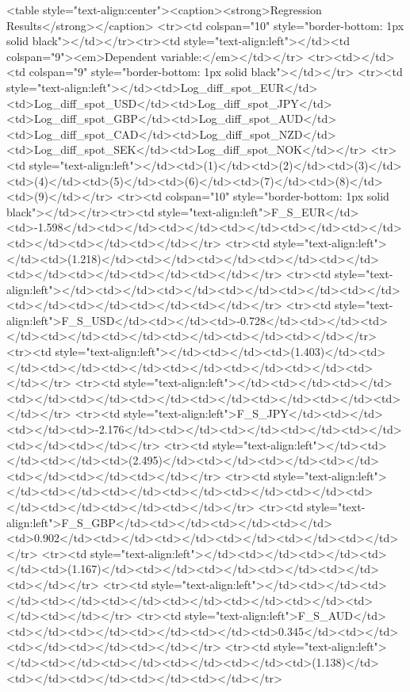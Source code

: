 
<table style="text-align:center"><caption><strong>Regression Results</strong></caption>
<tr><td colspan="10" style="border-bottom: 1px solid black"></td></tr><tr><td style="text-align:left"></td><td colspan="9"><em>Dependent variable:</em></td></tr>
<tr><td></td><td colspan="9" style="border-bottom: 1px solid black"></td></tr>
<tr><td style="text-align:left"></td><td>Log_diff_spot_EUR</td><td>Log_diff_spot_USD</td><td>Log_diff_spot_JPY</td><td>Log_diff_spot_GBP</td><td>Log_diff_spot_AUD</td><td>Log_diff_spot_CAD</td><td>Log_diff_spot_NZD</td><td>Log_diff_spot_SEK</td><td>Log_diff_spot_NOK</td></tr>
<tr><td style="text-align:left"></td><td>(1)</td><td>(2)</td><td>(3)</td><td>(4)</td><td>(5)</td><td>(6)</td><td>(7)</td><td>(8)</td><td>(9)</td></tr>
<tr><td colspan="10" style="border-bottom: 1px solid black"></td></tr><tr><td style="text-align:left">F_S_EUR</td><td>-1.598</td><td></td><td></td><td></td><td></td><td></td><td></td><td></td><td></td></tr>
<tr><td style="text-align:left"></td><td>(1.218)</td><td></td><td></td><td></td><td></td><td></td><td></td><td></td><td></td></tr>
<tr><td style="text-align:left"></td><td></td><td></td><td></td><td></td><td></td><td></td><td></td><td></td><td></td></tr>
<tr><td style="text-align:left">F_S_USD</td><td></td><td>-0.728</td><td></td><td></td><td></td><td></td><td></td><td></td><td></td></tr>
<tr><td style="text-align:left"></td><td></td><td>(1.403)</td><td></td><td></td><td></td><td></td><td></td><td></td><td></td></tr>
<tr><td style="text-align:left"></td><td></td><td></td><td></td><td></td><td></td><td></td><td></td><td></td><td></td></tr>
<tr><td style="text-align:left">F_S_JPY</td><td></td><td></td><td>-2.176</td><td></td><td></td><td></td><td></td><td></td><td></td></tr>
<tr><td style="text-align:left"></td><td></td><td></td><td>(2.495)</td><td></td><td></td><td></td><td></td><td></td><td></td></tr>
<tr><td style="text-align:left"></td><td></td><td></td><td></td><td></td><td></td><td></td><td></td><td></td><td></td></tr>
<tr><td style="text-align:left">F_S_GBP</td><td></td><td></td><td></td><td>0.902</td><td></td><td></td><td></td><td></td><td></td></tr>
<tr><td style="text-align:left"></td><td></td><td></td><td></td><td>(1.167)</td><td></td><td></td><td></td><td></td><td></td></tr>
<tr><td style="text-align:left"></td><td></td><td></td><td></td><td></td><td></td><td></td><td></td><td></td><td></td></tr>
<tr><td style="text-align:left">F_S_AUD</td><td></td><td></td><td></td><td></td><td>0.345</td><td></td><td></td><td></td><td></td></tr>
<tr><td style="text-align:left"></td><td></td><td></td><td></td><td></td><td>(1.138)</td><td></td><td></td><td></td><td></td></tr>
